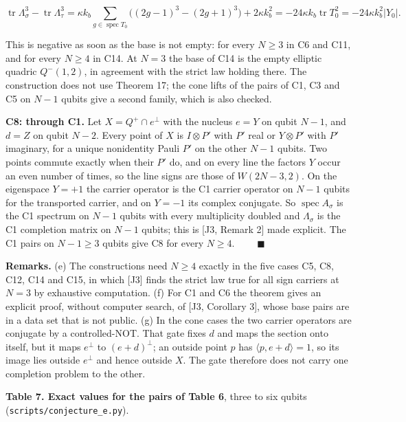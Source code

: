 \documentclass[11pt,a4paper]{article}
\begin{document}
\[\operatorname{tr}\Lambda_\sigma^3-\operatorname{tr}\Lambda_\tau^3
=\kappa k_b\sum_{g\in\operatorname{spec}T_0}\bigl((2g-1)^3-(2g+1)^3\bigr)+2\kappa k_b^2
=-24\kappa k_b\operatorname{tr}T_0^2=-24\kappa k_b^2\lvert Y_0\rvert.
\tag{E12}\]

This is negative as soon as the base is not empty: for every \(N\ge3\) in C6 and C11, and for every
\(N\ge4\) in C14. At \(N=3\) the base of C14 is the empty elliptic quadric \(Q^-(1,2)\), in agreement with the
strict law holding there. The construction does not use Theorem 17; the cone lifts of the pairs of C1,
C3 and C5 on \(N-1\) qubits give a second family, which is also checked.

\textbf{C8: through C1.} Let \(X=Q^+\cap e^\perp\) with the nucleus \(e=Y\) on qubit \(N-1\), and \(d=Z\) on qubit
\(N-2\). Every point of \(X\) is \(I\otimes P'\) with \(P'\) real or \(Y\otimes P'\) with \(P'\) imaginary, for a unique
nonidentity Pauli \(P'\) on the other \(N-1\) qubits. Two points commute exactly when their \(P'\) do, and on
every line the factors \(Y\) occur an even number of times, so the line signs are those of
\(W(2N-3,2)\). On the eigenspace \(Y=+1\) the carrier operator is the C1 carrier operator on \(N-1\) qubits for
the transported carrier, and on \(Y=-1\) its complex conjugate. So \(\operatorname{spec}A_\sigma\) is the C1
spectrum on \(N-1\) qubits with every multiplicity doubled and \(\Lambda_\sigma\) is the C1 completion matrix on \(N-1\) qubits; this is
{[}J3, Remark 2{]} made explicit. The C1 pairs on \(N-1\ge3\) qubits give C8 for every \(N\ge4\).
\(\qquad\blacksquare\)

\textbf{Remarks.} (e) The constructions need \(N\ge4\) exactly in the five cases C5, C8, C12, C14 and C15, in
which {[}J3{]} finds the strict law true for all sign carriers at \(N=3\) by exhaustive computation.
(f) For C1 and C6 the theorem gives an explicit proof, without computer search, of {[}J3, Corollary 3{]},
whose base pairs are in a data set that is not public. (g) In the cone cases the two carrier operators
are conjugate by a controlled-NOT. That gate fixes \(d\) and maps the section onto itself, but it maps
\(e^\perp\) to \((e+d)^\perp\); an outside point \(p\) has \(\langle p,e+d\rangle=1\), so its image lies outside \(e^\perp\)
and hence outside \(X\). The gate therefore does not carry one completion problem to the other.

\textbf{Table 7. Exact values for the pairs of Table 6}, three to six qubits (\nolinkurl{scripts/conjecture_e.py}).
\end{document}

